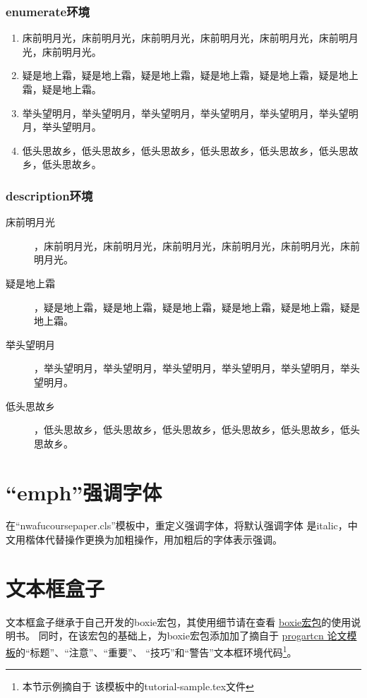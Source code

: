 \documentclass{nwafucoursepaper}
\begin{document}
\subsubsection{enumerate环境}
\begin{enumerate}
\item 床前明月光，床前明月光，床前明月光，床前明月光，床前明月光，床前明月光，床前明月光。
\item 疑是地上霜，疑是地上霜，疑是地上霜，疑是地上霜，疑是地上霜，疑是地上霜，疑是地上霜。
\item 举头望明月，举头望明月，举头望明月，举头望明月，举头望明月，举头望明月，举头望明月。
\item 低头思故乡，低头思故乡，低头思故乡，低头思故乡，低头思故乡，低头思故乡，低头思故乡。
\end{enumerate}
\subsubsection{description环境}
\begin{description}
\item[床前明月光]，床前明月光，床前明月光，床前明月光，床前明月光，床前明月光，床前明月光。
\item[疑是地上霜]，疑是地上霜，疑是地上霜，疑是地上霜，疑是地上霜，疑是地上霜，疑是地上霜。
\item[举头望明月]，举头望明月，举头望明月，举头望明月，举头望明月，举头望明月，举头望明月。
\item[低头思故乡]，低头思故乡，低头思故乡，低头思故乡，低头思故乡，低头思故乡，低头思故乡。
\end{description}

\section{\enquote{emph}强调字体}
在\enquote{nwafucoursepaper.cls}模板中，重定义强调字体，将默认强调字体
是italic，中文用楷体代替操作更换为加粗操作，用加粗后的字体表示强调。
\section{文本框盒子}
文本框盒子继承于自己开发的boxie宏包，其使用细节请在\github{}查看
\href{https://github.com/registor/boxiesty}{boxie宏包}的使用说明书。
同时，在该宏包的基础上，为boxie宏包添加加了摘自于
\href{https://github.com/WisdomFusion/latex-templates/tree/master/progartcn}{progartcn
  论文模板}的\enquote{标题}、\enquote{注意}、\enquote{重要}、
\enquote{技巧}和\enquote{警告}文本框环境代码\footnote{本节示例摘自于
  该模板中的tutorial-sample.tex文件}。
\end{document}
